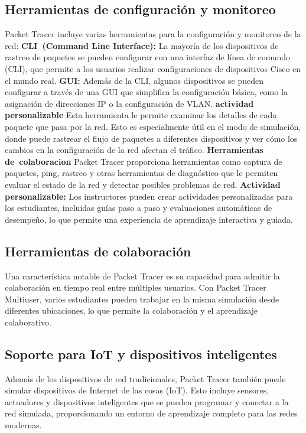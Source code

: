 \documentclass[a4paper,12pt]{article}
\begin{document}
\subsection{Herramientas de configuración y monitoreo}
Packet Tracer incluye varias herramientas para la configuración y monitoreo de la red:
\textbf{CLI (Command Line Interface):} La mayoría de los dispositivos de rastreo de paquetes se pueden configurar con una interfaz de línea de comando (CLI), que permite a los usuarios realizar configuraciones de dispositivos Cisco en el mundo real.
\textbf{GUI:} Además de la CLI, algunos dispositivos se pueden configurar a través de una GUI que simplifica la configuración básica, como la asignación de direcciones IP o la configuración de VLAN.
\textbf{actividad personalizable} Esta herramienta le permite examinar los detalles de cada paquete que pasa por la red. Esto es especialmente útil en el modo de simulación, donde puede rastrear el flujo de paquetes a diferentes dispositivos y ver cómo los cambios en la configuración de la red afectan el tráfico.
\textbf{Herramientas de colaboracion} Packet Tracer proporciona herramientas como captura de paquetes, ping, rastreo y otras herramientas de diagnóstico que le permiten evaluar el estado de la red y detectar posibles problemas de red.
\textbf{Actividad personalizable:} Los instructores pueden crear actividades personalizadas para los estudiantes, incluidas guías paso a paso y evaluaciones automáticas de desempeño, lo que permite una experiencia de aprendizaje interactiva y guiada.
\subsection{Herramientas de colaboración}
Una característica notable de Packet Tracer es su capacidad para admitir la colaboración en tiempo real entre múltiples usuarios. Con Packet Tracer Multiuser, varios estudiantes pueden trabajar en la misma simulación desde diferentes ubicaciones, lo que permite la colaboración y el aprendizaje colaborativo.
\subsection{Soporte para IoT y dispositivos inteligentes}
Además de los dispositivos de red tradicionales, Packet Tracer también puede simular dispositivos de Internet de las cosas (IoT). Esto incluye sensores, actuadores y dispositivos inteligentes que se pueden programar y conectar a la red simulada, proporcionando un entorno de aprendizaje completo para las redes modernas.
\end{document}
